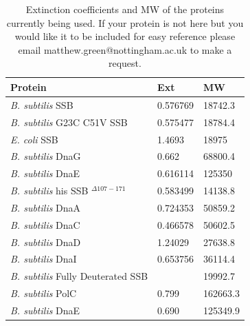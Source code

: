 \documentclass{tufte-book} %
\begin{document}

\begin{table}[ht]
  \centering
  \selectfont
  \begin{tabular}{lll}
    \toprule
    Protein & Ext & MW \\
    \midrule
    
\textit{B. subtilis} SSB							& 0.576769	&	 18742.3	\\
\textit{B. subtilis} G23C C51V SSB					& 0.575477	& 	18784.4	\\
\textit {E. coli} SSB								& 1.4693		& 	18975	\\
\textit{B. subtilis} DnaG							& 0.662		& 	68800.4	\\
\textit{B. subtilis} DnaE							& 0.616114	& 	125350	\\
\textit{B. subtilis} his SSB $^{\Delta107-171}$			& 0.583499	&	 14138.8	\\
\textit{B. subtilis} DnaA							& 0.724353	& 	50859.2	\\
\textit{B. subtilis} DnaC							& 0.466578	& 	50602.5	\\
\textit{B. subtilis} DnaD							& 1.24029 	& 	27638.8	\\
\textit{B. subtilis} DnaI 							& 0.653756	&	 36114.4	\\
\textit{B. subtilis} Fully Deuterated SSB				&			&	19992.7	\\
\textit{B. subtilis} PolC							& 0.799		&	162663.3	\\
\textit{B. subtilis} DnaE							& 0.690		&	125349.9	\\


    \bottomrule
  \end{tabular}
  \caption{Extinction coefficients and MW of the proteins currently being used. If your protein is not here but you would like it to be included for easy reference please email matthew.green@nottingham.ac.uk to make a request.}
  \label{tab:res}
\end{table}
\end{document}
